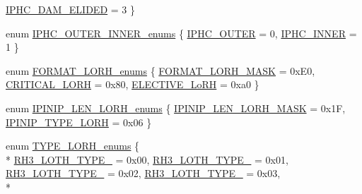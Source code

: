 \begin{DoxyCompactItemize}
\hyperlink{group___i_p_h_c_gga144ca0928b8496c2c689f8333b1bd1bbaa8772b0848901f0404edcda4cfcd7f32}{I\+P\+H\+C\+\_\+\+D\+A\+M\+\_\+\+E\+L\+I\+D\+ED} = 3
 \}
\item 
enum \hyperlink{group___i_p_h_c_ga003f1df19b93a65fba94fe9da28b49ec}{I\+P\+H\+C\+\_\+\+O\+U\+T\+E\+R\+\_\+\+I\+N\+N\+E\+R\+\_\+enums} \{ \hyperlink{group___i_p_h_c_gga003f1df19b93a65fba94fe9da28b49eca7119d5a4c95390311276a18f87fe4a7a}{I\+P\+H\+C\+\_\+\+O\+U\+T\+ER} = 0, 
\hyperlink{group___i_p_h_c_gga003f1df19b93a65fba94fe9da28b49eca5d2c2c9becc7f9690c34535b3d2f3385}{I\+P\+H\+C\+\_\+\+I\+N\+N\+ER} = 1
 \}
\item 
enum \hyperlink{group___i_p_h_c_gaf42928291183759641e2638dd2c9afab}{F\+O\+R\+M\+A\+T\+\_\+L\+O\+R\+H\+\_\+enums} \{ \hyperlink{group___i_p_h_c_ggaf42928291183759641e2638dd2c9afaba3cbff535ac378e0f5f9651d9f2b6da54}{F\+O\+R\+M\+A\+T\+\_\+L\+O\+R\+H\+\_\+\+M\+A\+SK} = 0x\+E0, 
\hyperlink{group___i_p_h_c_ggaf42928291183759641e2638dd2c9afabad5a6844384464fcc2485068d5c8c32c1}{C\+R\+I\+T\+I\+C\+A\+L\+\_\+L\+O\+RH} = 0x80, 
\hyperlink{group___i_p_h_c_ggaf42928291183759641e2638dd2c9afaba6a1de76283d3772be275c65f24c03cab}{E\+L\+E\+C\+T\+I\+V\+E\+\_\+Lo\+RH} = 0xa0
 \}
\item 
enum \hyperlink{group___i_p_h_c_ga74a5b574b1496b27ecab1606742fe075}{I\+P\+I\+N\+I\+P\+\_\+\+L\+E\+N\+\_\+L\+O\+R\+H\+\_\+enums} \{ \hyperlink{group___i_p_h_c_gga74a5b574b1496b27ecab1606742fe075a21c465a389e49fd640fe615329b31e20}{I\+P\+I\+N\+I\+P\+\_\+\+L\+E\+N\+\_\+L\+O\+R\+H\+\_\+\+M\+A\+SK} = 0x1F, 
\hyperlink{group___i_p_h_c_gga74a5b574b1496b27ecab1606742fe075af73b385bcbec88a8b56d0c4ec4ae6459}{I\+P\+I\+N\+I\+P\+\_\+\+T\+Y\+P\+E\+\_\+L\+O\+RH} = 0x06
 \}
\item 
enum \hyperlink{group___i_p_h_c_ga579fbbf2d022ab673ad28add45f01a94}{T\+Y\+P\+E\+\_\+L\+O\+R\+H\+\_\+enums} \{ \\*
\hyperlink{group___i_p_h_c_gga579fbbf2d022ab673ad28add45f01a94a7759d19a2a0fa6042db279e117aeb4fa}{R\+H3\+\_\+L\+O\+T\+H\+\_\+\+T\+Y\+P\+E\+\_} = 0x00, 
\hyperlink{group___i_p_h_c_gga579fbbf2d022ab673ad28add45f01a94a5c60b68cdb08500efbc070cc67ff3bdd}{R\+H3\+\_\+L\+O\+T\+H\+\_\+\+T\+Y\+P\+E\+\_} = 0x01, 
\hyperlink{group___i_p_h_c_gga579fbbf2d022ab673ad28add45f01a94adc4b06d63e556722f74a27bdc71b7ec6}{R\+H3\+\_\+L\+O\+T\+H\+\_\+\+T\+Y\+P\+E\+\_} = 0x02, 
\hyperlink{group___i_p_h_c_gga579fbbf2d022ab673ad28add45f01a94a3470898b6e4ff8e092494d8535ddf9d6}{R\+H3\+\_\+L\+O\+T\+H\+\_\+\+T\+Y\+P\+E\+\_} = 0x03, 
\\*

\end{DoxyCompactItemize}
